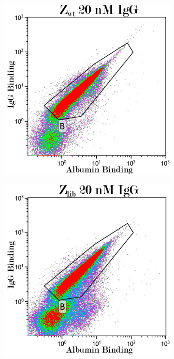 \documentclass{article}
\begin{document}
\begin{multicols}{2}
	\begin{figure}[H]
		\centering
			\begin{subfigure}{0.45\linewidth}
			\includegraphics[width=\linewidth]{images/flow_20_wt.png}
			\label{flow_41}
		\end{subfigure}
		\begin{subfigure}{0.45\linewidth}
			\includegraphics[width=\linewidth]{images/flow_20_lib.png}
			\label{flow_42}
		\end{subfigure}
	

\end{figure}
\end{multicols}
\end{document}
